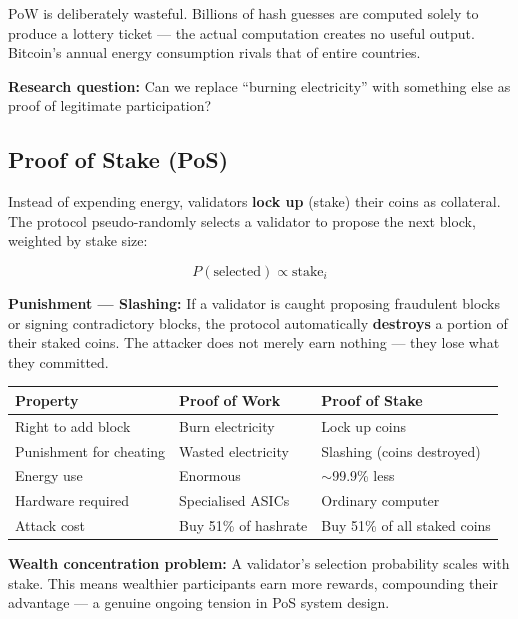 \documentclass[12pt, a4paper]{article}
\begin{document}
PoW is deliberately wasteful. Billions of hash guesses are computed solely to
produce a lottery ticket --- the actual computation creates no useful output.
Bitcoin's annual energy consumption rivals that of entire countries.

\textbf{Research question:} Can we replace ``burning electricity'' with something
else as proof of legitimate participation?

\subsection{Proof of Stake (PoS)}

Instead of expending energy, validators \textbf{lock up} (stake) their coins as
collateral. The protocol pseudo-randomly selects a validator to propose the next
block, weighted by stake size:

\[
P(\text{selected}) \propto \text{stake}_i
\]

\textbf{Punishment --- Slashing:} If a validator is caught proposing fraudulent
blocks or signing contradictory blocks, the protocol automatically \textbf{destroys}
a portion of their staked coins. The attacker does not merely earn nothing --- they
lose what they committed.

\begin{center}
\begin{tabular}{l l l}
\toprule
\textbf{Property} & \textbf{Proof of Work} & \textbf{Proof of Stake} \\
\midrule
Right to add block     & Burn electricity          & Lock up coins \\
Punishment for cheating & Wasted electricity        & Slashing (coins destroyed) \\
Energy use             & Enormous                  & $\sim$99.9\% less \\
Hardware required      & Specialised ASICs         & Ordinary computer \\
Attack cost            & Buy 51\% of hashrate      & Buy 51\% of all staked coins \\
\bottomrule
\end{tabular}
\end{center}

\textbf{Wealth concentration problem:} A validator's selection probability scales
with stake. This means wealthier participants earn more rewards, compounding their
advantage --- a genuine ongoing tension in PoS system design.
\end{document}
